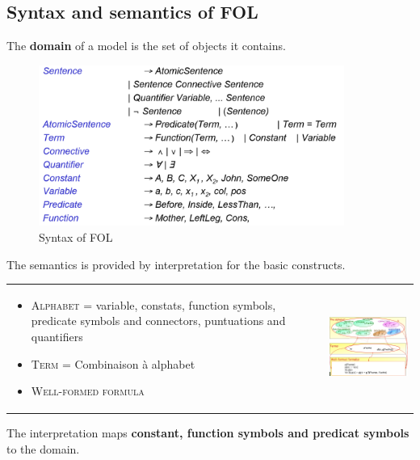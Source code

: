 \subsection{Syntax and semantics of FOL}
The \textbf{domain} of a model is the set of objects it contains.\\

	\begin{figure}[h]
		\centering
		\includegraphics[width=10cm]{fol_bnf.png}
		\caption{Syntax of FOL}
	\end{figure}

 The semantics is  provided by interpretation for  the basic constructs.

 \begin{tabular}{m{7cm}m{1cm}m{6cm}}
     \begin{itemize}
         \item \textsc{Alphabet} = variable, constats, function symbols, predicate symbols and 
             connectors, puntuations and quantifiers
         \item \textsc{Term} = Combinaison à alphabet
         \item \textsc{Well-formed formula}
     \end{itemize}
     &&
     \includegraphics[width=6cm]{fol.png}
 \end{tabular}


 The interpretation maps \textbf{constant, function symbols and predicat symbols}
 to the domain.

